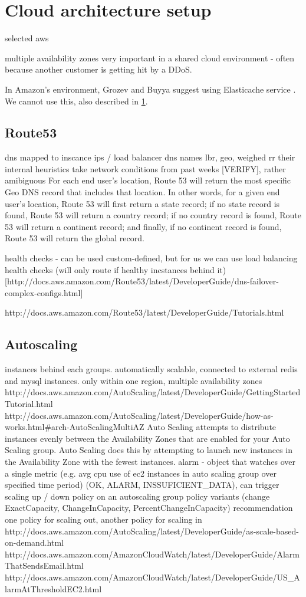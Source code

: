 \documentclass{uvamscse}
\begin{document}
\section{Cloud architecture setup} \label{Cloud architecture setup}

selected aws

multiple availability zones very important in a shared cloud environment - often because another customer is getting hit by a DDoS.\cite{GroBuy}

In Amazon’s environment, Grozev and Buyya suggest using Elasticache service \cite{GroBuy}. We cannot use this, also described in \ref{Cloud architecture setup}.

\subsection{Route53}
  dns mapped to inscance ips / load balancer dns names
  lbr, geo, weighed rr
  their internal heuristics take network conditions from past weeks [VERIFY], rather amibiguous
  For each end user’s location, Route 53 will return the most specific Geo DNS record that includes that location. In other words, for a given end user’s location, Route 53 will first return a state record; if no state record is found, Route 53 will return a country record; if no country record is found, Route 53 will return a continent record; and finally, if no continent record is found, Route 53 will return the global record.

  health checks - can be used custom-defined, but for us we can use load balancing health checks (will only route if healthy incstances behind it) [http://docs.aws.amazon.com/Route53/latest/DeveloperGuide/dns-failover-complex-configs.html]

  http://docs.aws.amazon.com/Route53/latest/DeveloperGuide/Tutorials.html
\subsection{Autoscaling}
  instances behind each groups. automatically scalable, connected to external redis and mysql instances.
  only within one region, multiple availability zones
  http://docs.aws.amazon.com/AutoScaling/latest/DeveloperGuide/GettingStartedTutorial.html
  http://docs.aws.amazon.com/AutoScaling/latest/DeveloperGuide/how-as-works.html\#arch-AutoScalingMultiAZ
  Auto Scaling attempts to distribute instances evenly between the Availability Zones that are enabled for your Auto Scaling group. Auto Scaling does this by attempting to launch new instances in the Availability Zone with the fewest instances.
  alarm - object that watches over a single metric (e.g. avg cpu use of ec2 instances in auto scaling group over specified time period) (OK, ALARM, INSSUFICIENT\_DATA), can trigger scaling up / down policy on an autoscaling group
  policy variants (change ExactCapacity, ChangeInCapacity, PercentChangeInCapacity)
  recommendation one policy for scaling out, another policy for scaling in
  http://docs.aws.amazon.com/AutoScaling/latest/DeveloperGuide/as-scale-based-on-demand.html
  http://docs.aws.amazon.com/AmazonCloudWatch/latest/DeveloperGuide/AlarmThatSendsEmail.html
  http://docs.aws.amazon.com/AmazonCloudWatch/latest/DeveloperGuide/US\_AlarmAtThresholdEC2.html
\end{document}
